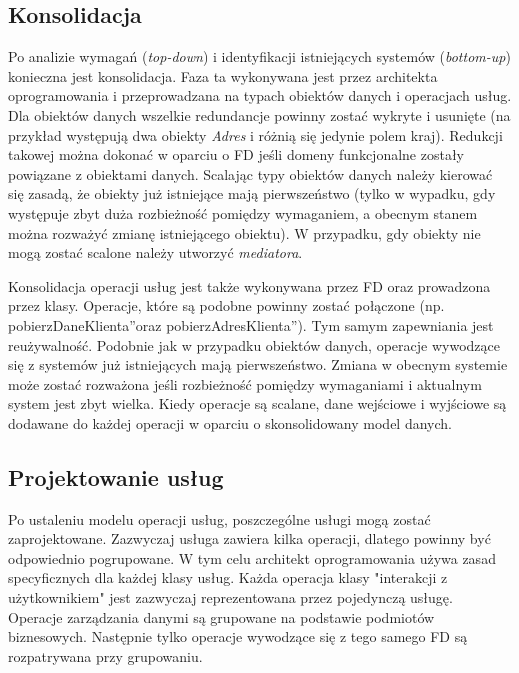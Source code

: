 \subsection*{Konsolidacja}
Po analizie wymagań (\emph{top-down}) i identyfikacji istniejących systemów (\emph{bottom-up}) konieczna jest konsolidacja. Faza ta wykonywana jest przez architekta oprogramowania i przeprowadzana na typach obiektów danych i operacjach usług. Dla obiektów danych wszelkie redundancje powinny zostać wykryte i usunięte (na przykład występują dwa obiekty \emph{Adres} i różnią się jedynie polem kraj). Redukcji takowej można dokonać w oparciu o FD jeśli domeny funkcjonalne zostały powiązane z obiektami danych. Scalając typy obiektów danych należy kierować się zasadą, że obiekty już istniejące mają pierwszeństwo (tylko w wypadku, gdy występuje zbyt duża rozbieżność pomiędzy wymaganiem, a obecnym stanem można rozważyć zmianę istniejącego obiektu). W przypadku, gdy obiekty nie mogą zostać scalone należy utworzyć \emph{mediatora}.

Konsolidacja operacji usług jest także wykonywana przez FD oraz prowadzona przez klasy. Operacje, które są podobne powinny zostać połączone (np. \quotedblbase pobierzDaneKlienta\textquotedblright oraz \quotedblbase pobierzAdresKlienta\textquotedblright). Tym samym zapewniania jest reużywalność. Podobnie jak w przypadku obiektów danych, operacje wywodzące się z systemów już istniejących mają pierwszeństwo. Zmiana w obecnym systemie może zostać rozważona jeśli rozbieżność pomiędzy wymaganiami i aktualnym system jest zbyt wielka. Kiedy operacje są scalane, dane wejściowe i wyjściowe są dodawane do każdej operacji w oparciu o skonsolidowany model danych.


\subsection*{Projektowanie usług}
Po ustaleniu modelu operacji usług, poszczególne usługi mogą zostać zaprojektowane. Zazwyczaj usługa zawiera kilka operacji, dlatego powinny być odpowiednio pogrupowane. W tym celu architekt oprogramowania używa zasad specyficznych dla każdej klasy usług. Każda operacja klasy "interakcji z użytkownikiem" jest zazwyczaj reprezentowana przez pojedynczą usługę. Operacje zarządzania danymi są grupowane na podstawie podmiotów biznesowych.  Następnie tylko operacje wywodzące się z tego samego FD są rozpatrywana przy grupowaniu. 

